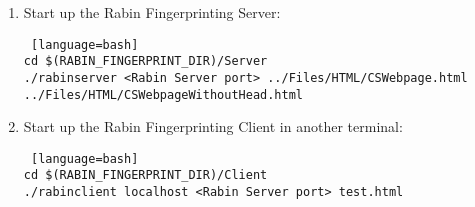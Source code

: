 \begin{enumerate}

\item 

Start up the Rabin Fingerprinting Server:

\begin{lstlisting} [language=bash] 
cd $(RABIN_FINGERPRINT_DIR)/Server
./rabinserver <Rabin Server port> ../Files/HTML/CSWebpage.html ../Files/HTML/CSWebpageWithoutHead.html
\end{lstlisting}

\item Start up the Rabin Fingerprinting Client in another terminal:

\begin{lstlisting} [language=bash] 
cd $(RABIN_FINGERPRINT_DIR)/Client
./rabinclient localhost <Rabin Server port> test.html
\end{lstlisting}

\end{enumerate}

